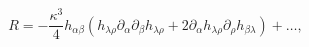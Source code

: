 \begin{equation}
R=-\frac{\kappa^3}4h_{\alpha\beta}(h_{\lambda\rho}\partial_\alpha\partial_\beta h_{\lambda\rho}+
2\partial_\alpha h_{\lambda\rho}\partial_\rho h_{\beta\lambda})+\ldots,
\end{equation}

